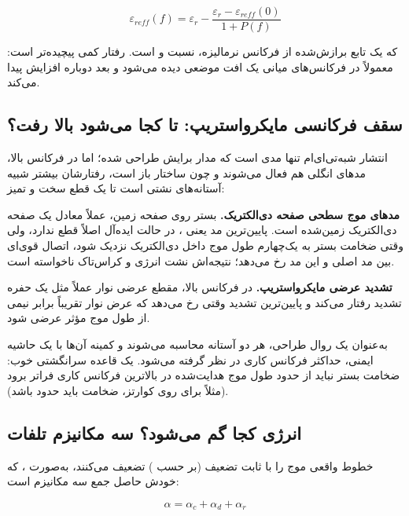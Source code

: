 \documentclass[12pt]{article}
\begin{document}
	\begin{equation}
		\varepsilon_{reff}(f) = \varepsilon_r - \frac{\varepsilon_r - \varepsilon_{reff}(0)}{1 + P(f)}
	\end{equation}
	
	که  یک تابع برازش‌شده از فرکانس نرمالیزه، نسبت  و  است. رفتار  کمی پیچیده‌تر است: معمولاً در فرکانس‌های میانی یک افت موضعی دیده می‌شود و بعد دوباره افزایش پیدا می‌کند.
	
	\subsection{سقف فرکانسی مایکرواستریپ: تا کجا می‌شود بالا رفت؟}
	
	انتشار شبه‌تی‌ای‌ام تنها مدی است که مدار برایش طراحی شده؛ اما در فرکانس بالا، مدهای انگلی هم فعال می‌شوند و چون ساختار باز است، رفتارشان بیشتر شبیه آستانه‌های نشتی است تا یک قطع سخت و تمیز:
	
	\textbf{مدهای موج سطحی صفحه دی‌الکتریک.} بستر روی صفحه زمین، عملاً معادل یک صفحه دی‌الکتریک زمین‌شده است. پایین‌ترین مد یعنی ، در حالت ایده‌آل اصلاً قطع ندارد، ولی وقتی ضخامت بستر به یک‌چهارم طول موج داخل دی‌الکتریک نزدیک شود، اتصال قوی‌ای بین مد اصلی و این مد رخ می‌دهد؛ نتیجه‌اش نشت انرژی و کراس‌تاک ناخواسته است.
	
	\textbf{تشدید عرضی مایکرواستریپ.} در فرکانس بالا، مقطع عرضی نوار عملاً مثل یک حفره تشدید رفتار می‌کند و پایین‌ترین تشدید وقتی رخ می‌دهد که عرض نوار تقریباً برابر نیمی از طول موج مؤثر عرضی شود.
	
	به‌عنوان یک روال طراحی، هر دو آستانه محاسبه می‌شوند و کمینه آن‌ها با یک حاشیه ایمنی، حداکثر فرکانس کاری در نظر گرفته می‌شود. یک قاعده سرانگشتی خوب: ضخامت بستر نباید از حدود  طول موج هدایت‌شده در بالاترین فرکانس کاری فراتر برود (مثلاً برای  روی کوارتز، ضخامت باید حدود  باشد).
	
	\subsection{انرژی کجا گم می‌شود؟ سه مکانیزم تلفات}
	
	خطوط واقعی موج را با ثابت تضعیف \lr{$\alpha$} (بر حسب ) تضعیف می‌کنند، به‌صورت ، که خودش حاصل جمع سه مکانیزم است:
	
	\begin{equation}
		\alpha = \alpha_c + \alpha_d + \alpha_r
	\end{equation}
	
\end{document}
